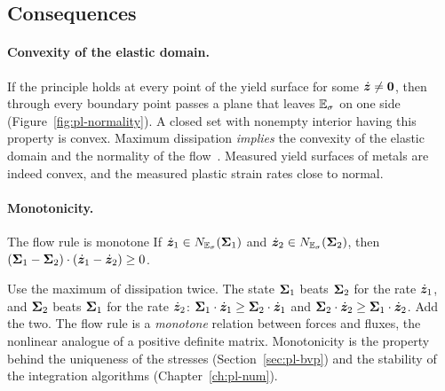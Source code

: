 \subsection{Consequences}\label{ssec:pl-consequences}
\paragraph{Convexity of the elastic domain.}
%
If the principle holds at every point of the yield surface for some
$\dot{\bm{z}}\ne\bm{0}$, then through every boundary point passes a plane that
leaves $\mathbb{E}_{\sigma}$ on one side (Figure~\ref{fig:pl-normality}). A closed set with
nonempty interior having this property is convex. Maximum dissipation
\emph{implies} the convexity of the elastic domain and the normality of the
flow~\cite{SimoHughes1998,Lubliner1990}. Measured yield surfaces of metals
are indeed convex, and the measured plastic strain rates close to normal.

\paragraph{Monotonicity.}
%
\begin{gbox}{The flow rule is monotone}\label{cor:pl-monotone}
If $\dot{\bm{z}}_1\in N_{\mathbb{E}_{\sigma}}(\bm{\Sigma}_1)$ and $\dot{\bm{z}}_2\in N_{\mathbb{E}_{\sigma}}(\bm{\Sigma}_2)$, then
$(\bm{\Sigma}_1-\bm{\Sigma}_2)\cdot(\dot{\bm{z}}_1-\dot{\bm{z}}_2)\ge0$.
\end{gbox}
\noindent Use the maximum of dissipation twice. The state $\bm{\Sigma}_1$ beats
$\bm{\Sigma}_2$ for the rate $\dot{\bm{z}}_1$, and $\bm{\Sigma}_2$ beats $\bm{\Sigma}_1$ for the rate
$\dot{\bm{z}}_2$:
$\bm{\Sigma}_1\cdot\dot{\bm{z}}_1\ge\bm{\Sigma}_2\cdot\dot{\bm{z}}_1$ and
$\bm{\Sigma}_2\cdot\dot{\bm{z}}_2\ge\bm{\Sigma}_1\cdot\dot{\bm{z}}_2$. Add the two.
The flow rule is a \emph{monotone} relation between forces and fluxes, the
nonlinear analogue of a positive definite matrix. Monotonicity is the
property behind the uniqueness of the stresses (Section~\ref{sec:pl-bvp})
and the stability of the integration algorithms (Chapter~\ref{ch:pl-num}).

